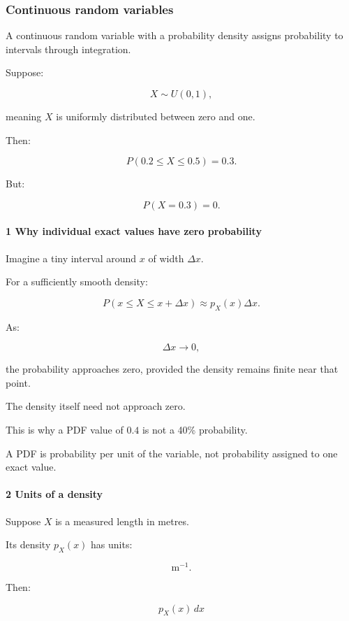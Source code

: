 \subsubsection{Continuous random variables}\label{continuous-random-variables}

A continuous random variable with a probability density assigns probability to intervals through integration.

Suppose:

\[
 X\sim U(0,1),
\]

meaning \(X\) is uniformly distributed between zero and one.

Then:

\[
 P(0.2\le X\le0.5)=0.3.
\]

But:

\[
 P(X=0.3)=0.
\]

\paragraph{1 Why individual exact values have zero probability}\label{why-individual-exact-values-have-zero-probability}

Imagine a tiny interval around \(x\) of width \(\Delta x\).

For a sufficiently smooth density:

\[
 P(x\le X\le x+\Delta x) \approx p_X(x)\Delta x.
\]

As:

\[
 \Delta x\to0,
\]

the probability approaches zero, provided the density remains finite near that point.

The density itself need not approach zero.

This is why a PDF value of \(0.4\) is not a 40\% probability.

A PDF is probability per unit of the variable, not probability assigned to one exact value.

\paragraph{2 Units of a density}\label{units-of-a-density}

Suppose \(X\) is a measured length in metres.

Its density \(p_X(x)\) has units:

\[
 \mathrm m^{-1}.
\]

Then:

\[
 p_X(x)\,dx
\]


